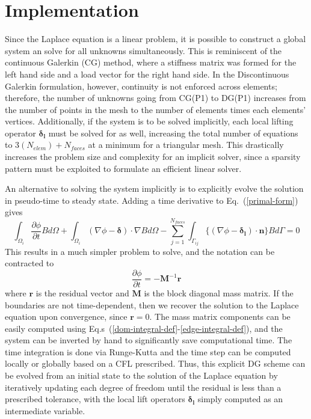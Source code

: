 \documentclass[a4paper]{article}
\newcommand{\eref}[1]{Eq.~(\ref{#1})}
\newcommand{\erefs}[2]{Eq.s~(\ref{#1}-\ref{#2})}
\newcommand{\dint}[1]{\int_{\Omega_i}{#1 d\Omega}}
\newcommand{\sint}[1]{\int_{\Gamma_{ij}}{#1 d\Gamma}}
\newcommand{\average}[1]{\ensuremath{\{#1\}} }
\newcommand{\glift}{\boldsymbol{\delta}}
\newcommand{\llift}{\boldsymbol{\delta_l}}
\newcommand{\unitn}{\mathbf{n}}
\newcommand{\mm}{\mathbf{M}}
\newcommand{\vr}{\mathbf{r}}
\begin{document}
\section{Implementation}
Since the Laplace equation is a linear problem, it is possible to construct a
global system an solve for all unknowns simultaneously.  This is reminiscent of
the continuous Galerkin (CG) method, where a stiffness matrix was formed for the left
hand side and a load vector for the right hand side.  In the Discontinuous Galerkin
formulation, however, continuity is not enforced across elements; therefore, the
number of unknowns going from CG(P1) to DG(P1) increases from the number of
points in the mesh to the number of elements times each elements' vertices.
Additionally, if the system is to be solved implicitly, each local lifting
operator $\llift$ must be solved for as well, increasing the total number of
equations to $3(N_{elem})+N_{faces}$ at a minimum for a triangular mesh.  This
drastically increases the problem size and complexity for an implicit solver,
since a sparsity pattern must be exploited to formulate an efficient linear
solver.

An alternative to solving the system implicitly is to explicitly evolve the
solution in pseudo-time to steady state.  Adding a time derivative to
\eref{primal-form} gives
\begin{equation}
  \dint{\frac{\partial \phi}{\partial t}B} +
  \dint{(\nabla \phi - \glift)\cdot \nabla B} -
  \sum_{j=1}^{N_{faces}}\sint{\average{(\nabla \phi - \llift)\cdot\unitn}B} = 0
  \label{primal-w-time}
\end{equation}
This results in a much simpler problem to solve, and the notation can be
contracted to
\begin{equation}
  \frac{\partial \phi}{\partial t} = -\mm^{-1} \vr
  \label{simple-explicit}
\end{equation}
where $\vr$ is the residual vector and $\mm$ is the block diagonal mass matrix.
If the boundaries are not time-dependent, then we recover the solution to the
Laplace equation upon convergence, since $\vr= 0$.  The mass matrix components can be
easily computed using \erefs{dom-integral-def}{edge-integral-def}, and the
system can be inverted by hand to significantly save computational time. The time
integration is done via Runge-Kutta and the time step can be computed locally or
globally based on a CFL prescribed.  Thus, this explicit DG scheme can be
evolved from an initial state to the solution of the Laplace equation by
iteratively updating each degree of freedom until the residual is less than a
prescribed tolerance, with the local lift operators $\llift$ simply computed as
an intermediate variable.
\end{document}

